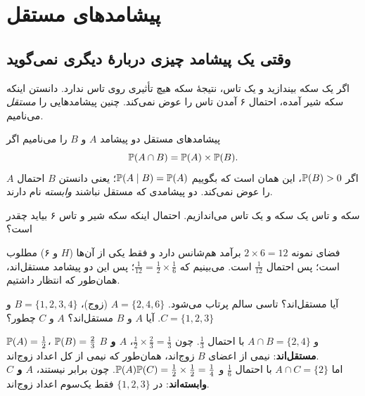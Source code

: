 \chapter{پیشامدهای مستقل}
\label{hs:ch5}


\section{وقتی یک پیشامد چیزی دربارهٔ دیگری نمی‌گوید}

اگر یک سکه بیندازید و یک تاس، نتیجهٔ سکه هیچ تأثیری روی تاس ندارد. دانستن اینکه سکه شیر آمده، احتمال ۶ آمدن تاس را عوض نمی‌کند. چنین پیشامدهایی را \emph{مستقل} می‌نامیم.

\begin{definition}[label=hs:def:indep]{پیشامدهای مستقل}
دو پیشامد $A$ و $B$ را  می‌نامیم اگر
\[ \P(A\cap B)=\P(A)\times\P(B). \]
اگر $\P(B)>0$، این همان است که بگوییم $\P(A\mid B)=\P(A)$؛ یعنی دانستن $B$ احتمال $A$ را عوض نمی‌کند. دو پیشامدی که مستقل نباشند \emph{وابسته} نام دارند.
\end{definition}

\begin{example}[label=hs:ex:coin-die]{سکه و تاس}
یک سکه و یک تاس می‌اندازیم. احتمال اینکه سکه شیر و تاس ۶ بیاید چقدر است؟
\begin{solution}
فضای نمونه $2\times6=12$ برآمد هم‌شانس دارد و فقط یکی از آن‌ها ($H$ و ۶) مطلوب است؛ پس احتمال $\tfrac1{12}$ است. می‌بینیم که $\tfrac1{12}=\tfrac12\times\tfrac16$؛ پس این دو پیشامد مستقل‌اند، همان‌طور که انتظار داشتیم.
\end{solution}
\end{example}

\begin{example}[label=hs:ex:die-indep]{آیا مستقل‌اند؟}
تاسی سالم پرتاب می‌شود. $A=\{2,4,6\}$ (زوج)، $B=\{1,2,3,4\}$ و $C=\{1,2,3\}$. آیا $A$ و $B$ مستقل‌اند؟ $A$ و $C$ چطور؟
\begin{solution}
$\P(A)=\tfrac12$، $\P(B)=\tfrac23$ و $A\cap B=\{2,4\}$ با احتمال $\tfrac13$. چون $\tfrac12\times\tfrac23=\tfrac13$، \textbf{$A$ و $B$ مستقل‌اند}: نیمی از اعضای $B$ زوج‌اند، همان‌طور که نیمی از کل اعداد زوج‌اند.\\
اما $A\cap C=\{2\}$ با احتمال $\tfrac16$ و $\P(A)\P(C)=\tfrac12\times\tfrac12=\tfrac14$. چون برابر نیستند، \textbf{$A$ و $C$ وابسته‌اند}: در $\{1,2,3\}$ فقط یک‌سوم اعداد زوج‌اند.
\end{solution}
\end{example}


